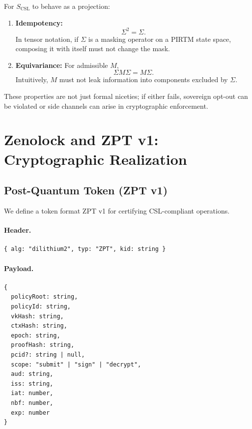 \documentclass[11pt]{article}
\begin{document}
For $S_{\mathrm{CSL}}$ to behave as a projection:

\begin{enumerate}[leftmargin=*]
  \item \textbf{Idempotency:}
        \begin{equation}
          \Sigma^2 = \Sigma.
          \label{eq:idempotent}
        \end{equation}
        In tensor notation, if $\Sigma$ is a masking operator on a PIRTM state space,
        composing it with itself must not change the mask.
  \item \textbf{Equivariance:}
        For admissible $M$,
        \begin{equation}
          \Sigma M \Sigma = M \Sigma.
          \label{eq:equivariant}
        \end{equation}
        Intuitively, $M$ must not leak information into components excluded by $\Sigma$.
\end{enumerate}

These properties are not just formal niceties; if either fails, sovereign opt-out can be violated or side channels can arise in cryptographic enforcement.

\section{Zenolock and ZPT v1: Cryptographic Realization}

\subsection{Post-Quantum Token (ZPT v1)}

We define a token format ZPT v1 for certifying CSL-compliant operations.

\paragraph{Header.}
\begin{verbatim}
{ alg: "dilithium2", typ: "ZPT", kid: string }
\end{verbatim}

\paragraph{Payload.}
\begin{verbatim}
{
  policyRoot: string,
  policyId: string,
  vkHash: string,
  ctxHash: string,
  epoch: string,
  proofHash: string,
  pcid?: string | null,
  scope: "submit" | "sign" | "decrypt",
  aud: string,
  iss: string,
  iat: number,
  nbf: number,
  exp: number
}
\end{verbatim}
\end{document}
